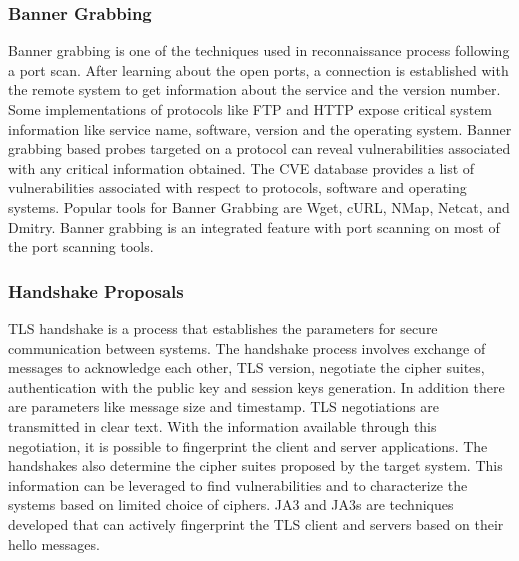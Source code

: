 \documentclass[../main.tex]{subfiles}
\begin{document}
\subsubsection{Banner Grabbing}
Banner grabbing is one of the techniques used in reconnaissance process following a port scan. After learning about the open ports, a connection is established with the remote system to get information about the service and the version number. Some implementations of protocols like FTP and HTTP expose critical system information like service name, software, version and the operating system. Banner grabbing based probes targeted on a protocol can reveal vulnerabilities associated with any critical information obtained. The CVE database \cite{CVE} provides a list of vulnerabilities associated with respect to protocols, software and operating systems. Popular tools for Banner Grabbing are Wget, cURL, NMap, Netcat, and Dmitry. Banner grabbing is an integrated feature with port scanning on most of the port scanning tools.  
\newline
\subsubsection{Handshake Proposals}
TLS handshake is a process that establishes the parameters for secure communication between systems. The handshake process involves exchange of messages to acknowledge each other, TLS version,  negotiate the cipher suites, authentication with the public key and session keys generation. In addition there are parameters like message size and timestamp. TLS negotiations are transmitted in clear text. With the information available through this negotiation, it is possible to fingerprint the client and server applications.  The handshakes also determine the cipher suites proposed by the target system. This information can be leveraged to find vulnerabilities and to characterize the systems based on limited choice of ciphers. JA3 and JA3s\cite{JA3} are techniques developed that can actively fingerprint the TLS client and servers based on their hello messages.
\newline
\end{document}
